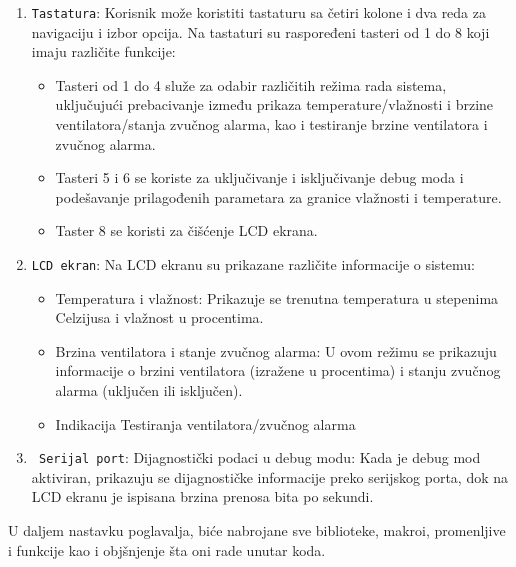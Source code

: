 \documentclass[a4paper, 12pt]{article}
\begin{document}
\begin{enumerate}

	\item \texttt{Tastatura}: Korisnik može koristiti tastaturu sa četiri kolone i dva reda za navigaciju i izbor opcija. Na tastaturi su raspoređeni tasteri od 1 do 8 koji imaju različite funkcije:
	\begin{itemize}
		\sloppypar
		\item Tasteri od 1 do 4 služe za odabir različitih režima rada sistema, uključujući prebacivanje između prikaza temperature/vlažnosti i brzine ventilatora/stanja zvučnog alarma, kao i testiranje brzine ventilatora i zvučnog alarma.
        \item Tasteri 5 i 6 se koriste za uključivanje i isključivanje debug moda i podešavanje prilagođenih parametara za granice vlažnosti i temperature.
        \item Taster 8 se koristi za čišćenje LCD ekrana.
	\end{itemize}
	
	
  	\item \texttt{LCD ekran}: Na LCD ekranu su prikazane različite informacije o sistemu:
  	\begin{itemize}
  		\item Temperatura i vlažnost: Prikazuje se trenutna temperatura u stepenima Celzijusa i vlažnost u procentima.
       	\item Brzina ventilatora i stanje zvučnog alarma: U ovom režimu se prikazuju informacije o brzini ventilatora (izražene u procentima) i stanju zvučnog alarma (uključen ili isključen).
		\item Indikacija Testiranja ventilatora/zvučnog alarma
  	\end{itemize}
  	
  	\item \texttt{ Serijal port}: Dijagnostički podaci u debug modu: Kada je debug mod aktiviran, prikazuju se dijagnostičke informacije preko serijskog porta, dok na LCD ekranu je ispisana brzina prenosa bita po sekundi.
\end{enumerate}

U daljem nastavku poglavalja, biće nabrojane sve biblioteke, makroi, promenljive i funkcije kao i objšnjenje šta oni rade unutar koda.
    
\vspace{10pt}
\end{document}
